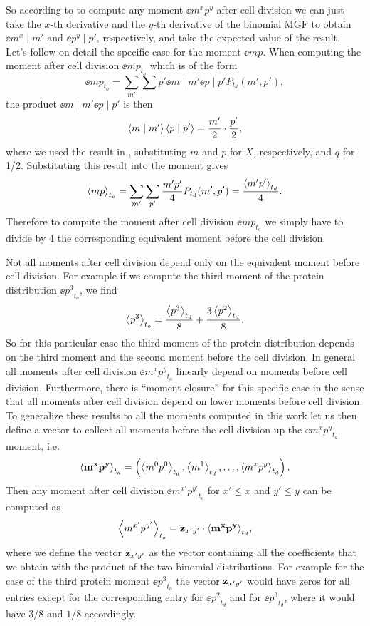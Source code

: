 So according to  to compute any moment $\ee{m^x
p^y}$ after cell division we can just take the $x$-th derivative and the $y$-th
derivative of the binomial MGF to obtain $\ee{m^x \mid m'}$ and $\ee{p^y \mid
p'}$, respectively, and take the expected value of the result. Let's follow on
detail the specific case for the moment $\ee{m p}$. When computing the moment
after cell division $\ee{mp}_{t_o}$ which is of
the form
\begin{equation}
\ee{mp}_{t_o} = \sum_{m'} \sum{p'} \ee{m \mid m'} \ee{p \mid p'} 
                P_{t_d}(m', p'),
\end{equation}
the product $\ee{m \mid m'} \ee{p \mid p'}$ is then
\begin{equation}
\left\langle m \mid m' \right\rangle \left\langle p \mid p' \right\rangle = {m' \over 2} \cdot {p' \over 2},
\end{equation}
where we used the result in , substituting $m$ and $p$ for
$X$, respectively, and $q$ for 1/2. Substituting this result into the moment
gives
\begin{equation}
\left\langle mp \right\rangle_{t_o} = \sum_{m'} \sum_{p'} {m' p' \over 4} P_{t_d}(m', p') 
              = {\left\langle m' p' \right\rangle_{t_d} \over 4}.
\end{equation}
Therefore to compute the moment after cell division $\ee{mp}_{t_o}$ we simply
have to divide by 4 the corresponding equivalent moment before the cell
division. 

Not all moments after cell division depend only on the equivalent moment before
cell division. For example if we compute the third moment of the protein
distribution $\ee{p^3}_{t_o}$, we find
\begin{equation}
  \left\langle p^3 \right\rangle_{t_o} = {\left\langle p^3 \right\rangle_{t_d} \over 8} + {3 \left\langle p^2 \right\rangle_{t_d} \over 8}.
\end{equation}
So for this particular case the third moment of the protein distribution
depends on the third moment and the second moment before the cell division. In
general all moments after cell division $\ee{m^x p^y}_{t_o}$ linearly depend on
moments before cell division. Furthermore, there is ``moment closure'' for this
specific case in the sense that all moments after cell division depend on lower
moments before cell division. To generalize these results to all the moments
computed in this work let us then define a vector to collect all moments before
the cell division up the $\ee{m^x p^y}_{t_d}$ moment, i.e.
\begin{equation}
\mathbf{\left\langle m^x p^y \right\rangle}_{t_d} = \left(
\left\langle m^0 p^0 \right\rangle_{t_d}, \left\langle m^1 \right\rangle_{t_d}, \ldots , \left\langle m^x p^y \right\rangle_{t_d}
\right).
\end{equation}
Then any moment after cell division $\ee{m^{x'} p^{y'}}_{t_o}$ for $x' \leq x$ and $y' \leq y$ can be computed as
$$
\left\langle m^{x'} p^{y'} \right\rangle_{t_o} = \mathbf{z}_{x'y'} \cdot \mathbf{\left\langle m^x p^y \right\rangle}_{t_d},
$$
where we define the vector $\mathbf{z}_{x'y'}$ as the vector containing all the coefficients that we obtain with the product of the two binomial distributions.
For example for the case of the third protein moment $\ee{p^3}_{t_o}$ the vector $\mathbf{z}_{x'y'}$ would have zeros for all entries except for the corresponding entry for $\ee{p^2}_{t_d}$ and for $\ee{p^3}_{t_d}$, where it would have $3/8$ and $1/8$ accordingly.

